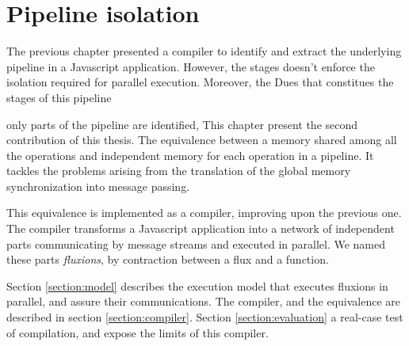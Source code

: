 \chapter{Pipeline isolation} \label{chapter6}
\minitoc
\eject

The previous chapter presented a compiler to identify and extract the underlying pipeline in a Javascript application.
However, the stages doesn't enforce the isolation required for parallel execution.
Moreover, the Dues that constitues the stages of this pipeline 

only parts of the pipeline are identified, 
This chapter present the second contribution of this thesis.
The equivalence between a memory shared among all the operations and independent memory for each operation in a pipeline.
It tackles the problems arising from the translation of the global memory synchronization into message passing.

This equivalence is implemented as a compiler, improving upon the previous one.
The compiler transforms a Javascript application into a network of independent parts communicating by message streams and executed in parallel.
We named these parts \textit{fluxions}, by contraction between a flux and a function.

Section \ref{section:model} describes the execution model that executes fluxions in parallel, and assure their communications.
The compiler, and the equivalence are described in section \ref{section:compiler}.
Section \ref{section:evaluation} a real-case test of compilation, and expose the limits of this compiler.



